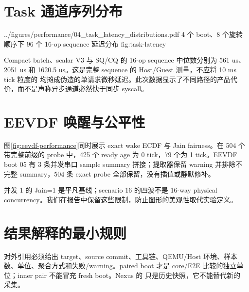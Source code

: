 \section{Task 通道序列分布}

  {../figures/performance/04_task_latency_distributions.pdf}
  {4 个 boot、8 个旋转顺序下 96 个 16-op sequence 延迟分布}
  {fig:task-latency}

Compact batch、scalar V3 与 SQ/CQ 的 16-op sequence 中位数分别为 561 us、2051 us 和 1620.5 us。这是完整 sequence 的 Host/Guest 测量，不应将 10 ms tick 粒度的  均摊成伪造的单请求微秒延迟。此次数据显示了不同路径的产品代价，而不是声称异步通道必然快于同步 syscall。

\section{EEVDF 唤醒与公平性}

图\ref{fig:eevdf-performance}同时展示 exact wake ECDF 与 Jain fairness。在 504 个带完整前缀的 probe 中，425 个 ready age 为 0 tick，79 个为 1 tick。EEVDF boot 05 有 3 条并发串口 sample summary 拼接；提取器保留 warning 并排除不完整 summary，504 条 exact probe 全部保留，没有插值或静默修补。

并发 1 的 Jain=1 是平凡基线；scenario 16 的四波不是 16-way physical concurrency。我们在报告中保留这些限制，防止图形的美观性取代实验定义。

\section{结果解释的最小规则}

\begin{evidencebox}[引用性能数字时必须同时披露]
对外引用必须给出 target、source commit、工具链、QEMU/Host 环境、样本数、单位、聚合方式和失败/warning。paired boot 才是 core/E2E 比较的独立单位；inner pair 不能冒充 fresh boot。Nexus 的  只是历史快照，它不能替代新的  采集。
\end{evidencebox}
